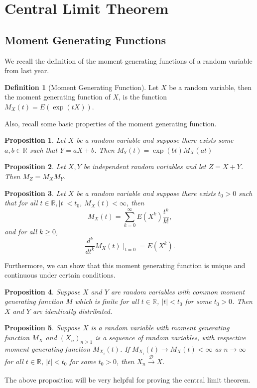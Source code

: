 \documentclass[
]{article}
\newtheorem{prop}{Proposition}[theorem]
\theoremstyle{definition}
\newtheorem{definition}{Definition}[section]
\begin{document}
\hypertarget{central-limit-theorem}{%
\section{Central Limit Theorem}\label{central-limit-theorem}}

\hypertarget{moment-generating-functions}{%
\subsection{Moment Generating
Functions}\label{moment-generating-functions}}

We recall the definition of the moment generating functions of a random
variable from last year.

\begin{definition}[Moment Generating Function]
  Let \(X\) be a random variable, then the moment generating function of \(X\), 
  is the function \(M_X(t) = E(\exp(tX))\). 
\end{definition}

Also, recall some basic properties of the moment generating function.

\begin{prop}
  Let \(X\) be a random variable and suppose there exists some 
  \(a, b \in \mathbb{R}\) such that \(Y = aX + b\). Then \(M_Y(t) = \exp(bt)M_X(at)\)
\end{prop}
\begin{prop}
  Let \(X, Y\) be independent random variables and let \(Z = X + Y\). Then 
  \(M_Z = M_X M_Y\).
\end{prop}
\begin{prop}
  Let \(X\) be a random variable and suppose there exists \(t_0 > 0\) such that 
  for all \(t \in \mathbb{R}, \left| t \right| < t_0\), \(M_X(t) < \infty\), 
  then 
  \[M_X(t) = \sum_{k = 0}^\infty E(X^k) \frac{t^k}{k!},\]
  and for all \(k \ge 0\), 
  \[\frac{d^k}{dt^k}M_X(t)\mid_{t = 0} = E(X^k).\]
\end{prop}

Furthermore, we can show that this moment generating function is unique
and continuous under certain conditions.

\begin{prop}
  Suppose \(X\) and \(Y\) are random variables with common moment generating 
  function \(M\) which is finite for all \(t \in \mathbb{R}\), 
  \(\left| t \right| < t_0\) for some \(t_0 > 0\). Then \(X\) and \(Y\) are 
  identically distributed.
\end{prop}

\begin{prop}
  Suppose \(X\) is a random variable with moment generating function \(M_X\) and 
  \((X_n)_{n \ge 1}\) is a sequence of random variables, with respective moment 
  generating function \(M_{X_i}(t)\). If \(M_{X_i}(t) \to M_X(t) < \infty\) as 
  \(n \to \infty\) for all \(t \in \mathbb{R}\), \(\left| t \right| < t_0\) for 
  some \(t_0 > 0\), then \(X_n \xrightarrow[]{\mathcal{D}} X\).
\end{prop}

The above proposition will be very helpful for proving the central limit
theorem.
\end{document}
